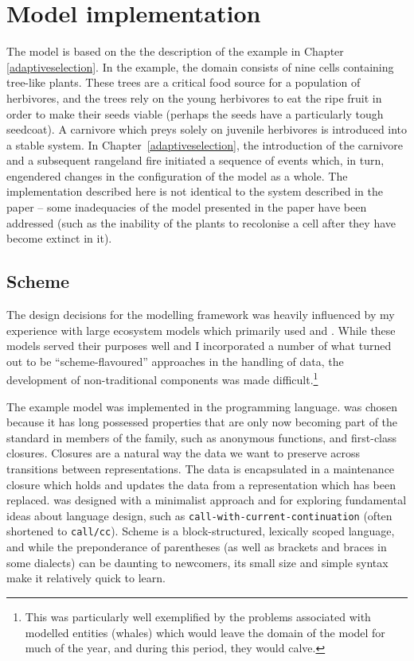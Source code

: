 \section{Model implementation}

The model is based on the the description of the example in Chapter
\ref{adaptiveselection}. In the example, the domain consists of nine
cells containing tree-like plants. These trees are a critical food
source for a population of herbivores, and the trees rely on the young
herbivores to eat the ripe fruit in order to make their seeds viable
(perhaps the seeds have a particularly tough seedcoat). A carnivore
which preys solely on juvenile herbivores is introduced into a stable
system.  In Chapter~\ref{adaptiveselection}, the introduction of the
carnivore and a subsequent rangeland fire initiated a sequence of
events which, in turn, engendered changes in the configuration of the
model as a whole.  The implementation described here is not identical
to the system described in the paper -- some inadequacies of the model
presented in the paper have been addressed (such as the inability of
the plants to recolonise a cell after they have become extinct in it).


\subsection{Scheme}
The design decisions for the modelling framework was heavily
influenced by my experience with large ecosystem models which
primarily used \Cpp and \CC.  While these models served their purposes
well and I incorporated a number of what turned out to be
``scheme-flavoured'' approaches in the handling of data, the
development of non-traditional components was made
difficult.\footnote{This was particularly well exemplified by the
problems associated with modelled entities (whales) which would leave
the domain of the model for much of the year, and during this period,
they would calve.}

The example model was implemented in the \Scheme programming language.
\Scheme was chosen because it has long possessed properties that are
only now becoming part of the standard in members of the \CC family,
such as anonymous functions, and first-class closures. Closures are a
natural way the data we want to preserve across transitions between
representations. The data is encapsulated in a maintenance
closure which holds and updates the data from a
representation which has been replaced. \Scheme was designed with a
minimalist approach and for exploring fundamental ideas about language
design, such as \texttt{call-with-current-continuation} (often
shortened to \texttt{call/cc}).  Scheme is a block-structured,
lexically scoped language, and while the preponderance of parentheses
(as well as brackets and braces in some dialects) can be daunting to
newcomers, its small size and simple syntax make it relatively quick
to learn.

